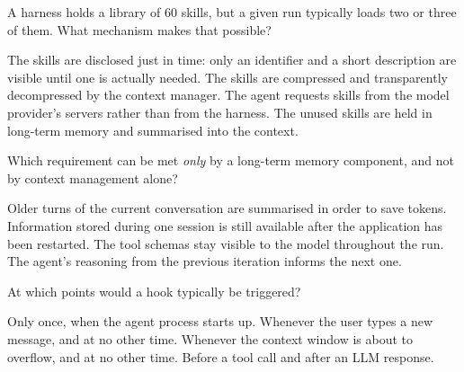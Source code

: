 \begin{questions}
\qitem A harness holds a library of 60 skills, but a given run typically loads two or three of them.
What mechanism makes that possible?
\begin{choices}
  \CorrectChoice The skills are disclosed just in time: only an identifier and a short description are visible until one is actually needed.
  \choice The skills are compressed and transparently decompressed by the context manager.
  \choice The agent requests skills from the model provider's servers rather than from the harness.
  \choice The unused skills are held in long-term memory and summarised into the context.
\end{choices}
\dontknow
{}


\qitem Which requirement can be met \emph{only} by a long-term memory component, and not by context
management alone?
\begin{choices}
  \choice Older turns of the current conversation are summarised in order to save tokens.
  \CorrectChoice Information stored during one session is still available after the application has been restarted.
  \choice The tool schemas stay visible to the model throughout the run.
  \choice The agent's reasoning from the previous iteration informs the next one.
\end{choices}
\dontknow
{}

\qitem At which points would a hook typically be triggered?
\begin{choices}
  \choice Only once, when the agent process starts up.
  \choice Whenever the user types a new message, and at no other time.
  \choice Whenever the context window is about to overflow, and at no other time.
  \CorrectChoice Before a tool call and after an LLM response.
\end{choices}
\dontknow
{}


\end{questions}
